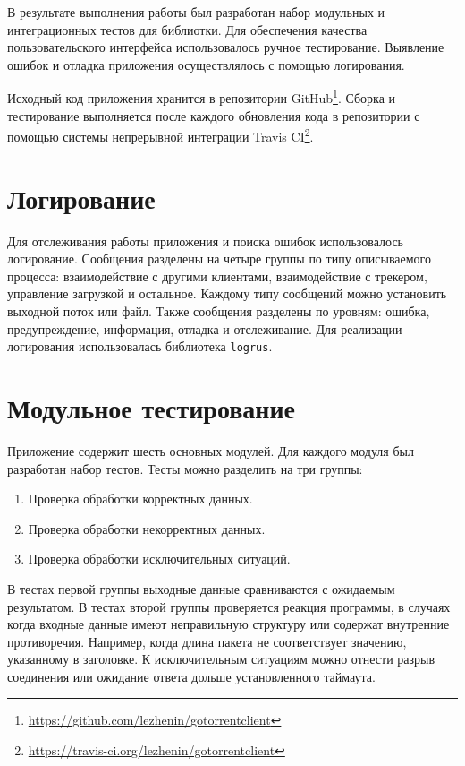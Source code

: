 \documentclass[a4paper,14pt]{extarticle}
\begin{document}
В результате выполнения работы был разработан набор модульных и интеграционных 
тестов для библиотки. Для обеспечения качества пользовательского интерфейса 
использовалось ручное тестирование. Выявление ошибок и отладка приложения 
осуществлялось с помощью логирования.

Исходный код приложения хранится в репозитории 
GitHub\footnote{\url{https://github.com/lezhenin/gotorrentclient}}. Сборка и 
тестирование выполняется после каждого обновления кода в репозитории с помощью 
системы непрерывной интеграции Travis 
CI\footnote{\url{https://travis-ci.org/lezhenin/gotorrentclient}}.

\section{Логирование}

Для отслеживания работы приложения и поиска ошибок использовалось логирование.
Сообщения разделены на четыре группы по типу описываемого процесса: 
взаимодействие с другими клиентами, взаимодействие с трекером, управление 
загрузкой и остальное. Каждому типу сообщений можно установить выходной поток 
или файл. Также сообщения разделены по уровням: ошибка, предупреждение, 
информация, отладка и отслеживание. Для реализации логирования использовалась 
библиотека \texttt{logrus}.

\section{Модульное тестирование}\label{sec:unit-test}
    
Приложение содержит шесть основных модулей. Для каждого модуля был разработан 
набор тестов. Тесты можно разделить на три группы: 
\begin{enumerate}[nosep]
 \item Проверка обработки корректных данных.
 \item Проверка обработки некорректных данных.
 \item Проверка обработки исключительных ситуаций.
\end{enumerate}
В тестах первой группы выходные данные сравниваются с ожидаемым результатом. В 
тестах второй группы проверяется реакция программы, в случаях когда входные 
данные имеют неправильную структуру или содержат внутренние противоречия. 
Например, когда длина пакета не соответствует значению, указанному в заголовке. 
К исключительным ситуациям можно отнести разрыв соединения или ожидание ответа 
дольше установленного таймаута.
\end{document}
